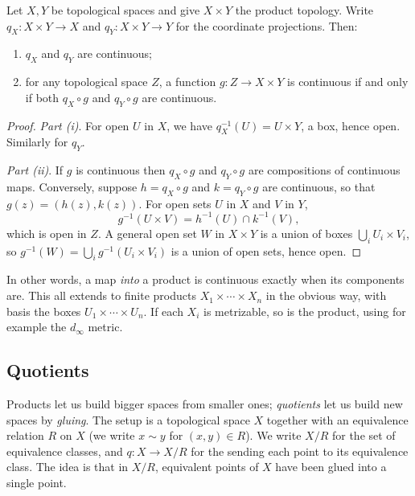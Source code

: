 \begin{proposition}
    Let $X, Y$ be topological spaces and give $X \times Y$ the product topology. Write $q_X: X \times Y \rightarrow X$ and $q_Y: X \times Y \rightarrow Y$ for the coordinate projections. Then:
    \begin{enumerate}[label=(\roman*)]
        \item $q_X$ and $q_Y$ are continuous;
        \item for any topological space $Z$, a function $g: Z \rightarrow X \times Y$ is continuous if and only if both $q_X \circ g$ and $q_Y \circ g$ are continuous.
    \end{enumerate}
\end{proposition}
\begin{proof}
    \emph{Part (i)}. For open $U$ in $X$, we have $q_X^{-1}(U) = U \times Y$, a box, hence open. Similarly for $q_Y$.

    \emph{Part (ii)}. If $g$ is continuous then $q_X \circ g$ and $q_Y \circ g$ are compositions of continuous maps. Conversely, suppose $h = q_X \circ g$ and $k = q_Y \circ g$ are continuous, so that $g(z) = (h(z), k(z))$. For open sets $U$ in $X$ and $V$ in $Y$,
    $$
    g^{-1}(U \times V) = h^{-1}(U) \cap k^{-1}(V),
    $$
    which is open in $Z$. A general open set $W$ in $X \times Y$ is a union of boxes $\bigcup_{i} U_i \times V_i$, so $g^{-1}(W) = \bigcup_i g^{-1}(U_i \times V_i)$ is a union of open sets, hence open.
\end{proof}

In other words, a map \emph{into} a product is continuous exactly when its components are. This all extends to finite products $X_1 \times \cdots \times X_n$ in the obvious way, with basis the boxes $U_1 \times \cdots \times U_n$. If each $X_i$ is metrizable, so is the product, using for example the $d_{\infty}$ metric.

\subsection{Quotients}

Products let us build bigger spaces from smaller ones; \emph{quotients} let us build new spaces by \emph{gluing}. The setup is a topological space $X$ together with an equivalence relation $R$ on $X$ (we write $x \sim y$ for $(x, y) \in R$). We write $X/R$ for the set of equivalence classes, and $q: X \rightarrow X/R$ for the  sending each point to its equivalence class. The idea is that in $X/R$, equivalent points of $X$ have been glued into a single point.

